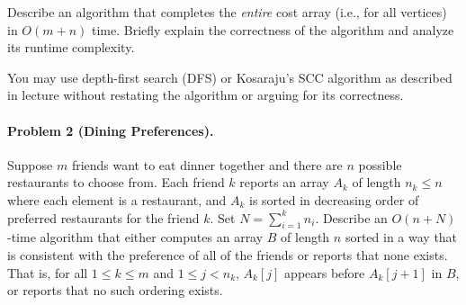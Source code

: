 \documentclass[11pt]{article}
\begin{document}
\begin{figure}[!h]
\centering
{}
\end{figure}
 
Describe an algorithm that completes the {\em entire} {\sc cost} array (i.e., for all vertices) in $O(m + n)$ time. Briefly explain the correctness of the algorithm and analyze its runtime complexity.

You may use depth-first search (DFS) or Kosaraju's SCC algorithm as described in lecture without restating the algorithm or arguing for its correctness.

\newpage
\paragraph{Problem 2 (Dining Preferences).} Suppose $m$ friends want to eat dinner together and there are $n$ possible restaurants to choose from. Each friend $k$ reports an array $A_k$ of length $n_k \leq n$ where each element is a restaurant, and $A_k$ is sorted in decreasing order of preferred restaurants for the friend $k$. Set $N = \sum_{i=1}^k n_i$. Describe an $O(n+N)$-time algorithm that either computes an array $B$ of length $n$ sorted in a way that is consistent with the preference of all of the friends or reports that none exists. That is, 
for all $1\le k \le m$ and $1 \le j < n_k$, $A_k[j]$ appears before $A_k[j+1]$ in $B$, or reports that no such ordering exists. 
\end{document}

